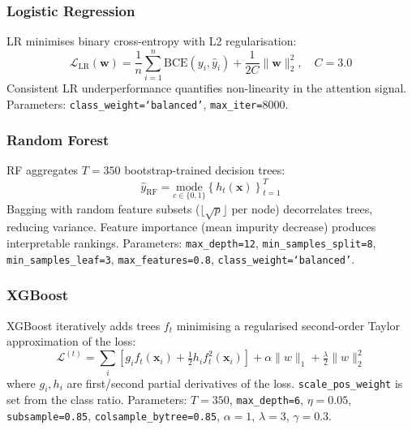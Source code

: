 \documentclass[conference]{IEEEtran}
\begin{document}
\subsubsection{Logistic Regression}

LR minimises binary cross-entropy with L2 regularisation:
\begin{equation}
\mathcal{L}_{\text{LR}}(\mathbf{w}) =
  \frac{1}{n}\!\sum_{i=1}^{n}\!\text{BCE}(y_i, \hat{y}_i)
  + \frac{1}{2C}\|\mathbf{w}\|_2^2, \quad C=3.0
\label{eq:lr}
\end{equation}
Consistent LR underperformance quantifies non-linearity in the attention
signal. Parameters: \texttt{class\_weight=`balanced'}, \texttt{max\_iter=}8000.

\subsubsection{Random Forest}

RF aggregates $T = 350$ bootstrap-trained decision trees:
\begin{equation}
\hat{y}_{\text{RF}} = \underset{c \in \{0,1\}}{\text{mode}}
  \left\{ h_t(\mathbf{x}) \right\}_{t=1}^{T}
\label{eq:rf}
\end{equation}
Bagging with random feature subsets ($\lfloor\sqrt{p}\rfloor$ per node)
decorrelates trees, reducing variance. Feature importance (mean impurity
decrease) produces interpretable rankings. Parameters:
\texttt{max\_depth=12}, \texttt{min\_samples\_split=8},
\texttt{min\_samples\_leaf=3}, \texttt{max\_features=0.8},
\texttt{class\_weight=`balanced'}.

\subsubsection{XGBoost}

XGBoost iteratively adds trees $f_t$ minimising a regularised
second-order Taylor approximation of the loss:
\begin{equation}
\mathcal{L}^{(t)} =
  \sum_{i}\!\left[g_i f_t(\mathbf{x}_i)
    + \tfrac{1}{2}h_i f_t^2(\mathbf{x}_i)\right]
  + \alpha\|w\|_1 + \tfrac{\lambda}{2}\|w\|_2^2
\label{eq:xgb}
\end{equation}
where $g_i, h_i$ are first/second partial derivatives of the loss.
\texttt{scale\_pos\_weight} is set from the class ratio. Parameters:
$T=350$, \texttt{max\_depth=6}, $\eta=0.05$, \texttt{subsample=0.85},
\texttt{colsample\_bytree=0.85}, $\alpha=1$, $\lambda=3$, $\gamma=0.3$.
\end{document}
